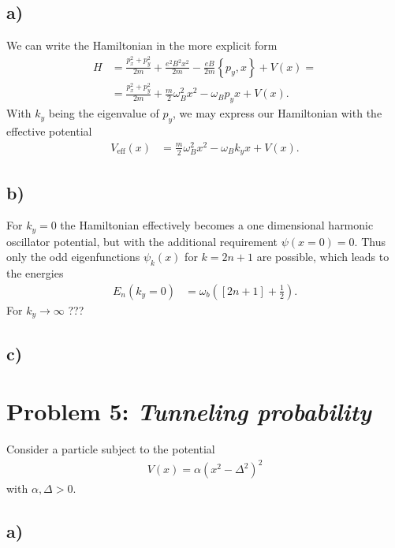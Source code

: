 \documentclass[english, parskip=full]{scrartcl}
\newcommand{\kla}{}
\newcommand{\klammer}{}
\newcommand{\tecxt}{}
\begin{document}
\subsection*{a)}
We can write the Hamiltonian in the more explicit form
\begin{align}
H &= \frac{p_x^2+p_y^2}{2m} + \frac{e^2B^2x^2}{2m} - \frac{eB}{2m}\klammer\left\{ p_y, x \right\} + V(x) = \\
&=  \frac{p_x^2+p_y^2}{2m} + \frac{m}{2}\omega_B^2x^2 - \omega_Bp_yx + V(x).
\end{align}
With $k_y$ being the eigenvalue of $p_y$, we may express our Hamiltonian with the effective potential
\begin{align}
V_\tecxt\text{eff}(x) &= \frac{m}{2}\omega_B^2x^2-\omega_Bk_yx + V(x).
\end{align}
\subsection*{b)}
For $k_y=0$ the Hamiltonian effectively becomes a one dimensional harmonic oscillator potential, but with the additional requirement $\psi(x=0)=0$.
Thus only the odd eigenfunctions $\psi_k(x)$ for $k=2n+1$ are possible, which leads to the energies
\begin{align}
E_n(k_y=0) &= \omega_b \kla\left( [2n+1] + \frac{1}{2} \right).
\end{align}
For $k_y\rightarrow\infty$ ???
\subsection*{c)}

\section*{Problem 5: \normalfont\textit{\large{Tunneling probability}}}
Consider a particle subject to the potential
\begin{align}
V(x) = \alpha (x^2 - \Delta^2)^2
\end{align}
with $\alpha,\Delta> 0$.
\subsection*{a)}
\end{document}
